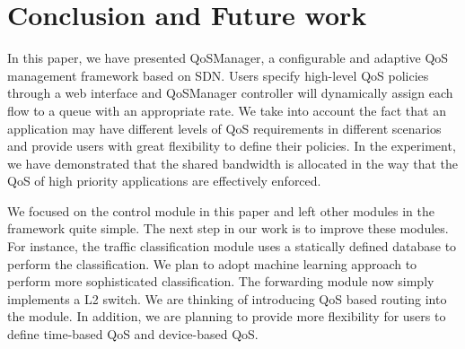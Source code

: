 \section{Conclusion and Future work}
\label{sect:future}

In this paper, we have presented QoSManager, a configurable and adaptive QoS management framework
based on SDN. Users specify high-level QoS policies through a web interface and QoSManager controller
will dynamically assign each flow to a queue with an appropriate rate. We take into account the fact
that an application may have different levels of QoS requirements in different scenarios and provide
users with great flexibility to define their policies. In the experiment, we have demonstrated that
the shared bandwidth is allocated in the way that the QoS of high priority applications are effectively
enforced.

We focused on the control module in this paper and left other modules in the framework quite simple.
The next step in our work is to improve these modules. For instance, the traffic classification module
uses a statically defined database to perform the classification. We plan to adopt machine learning
approach to perform more sophisticated classification. The forwarding module now simply implements a L2
switch. We are thinking of introducing QoS based routing into the module. In addition, we
are planning to provide more flexibility for users to define time-based QoS and device-based QoS.
